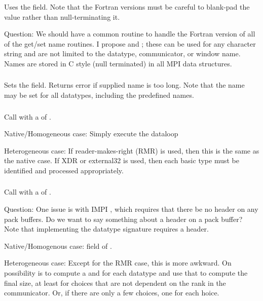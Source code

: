 \documentclass{article}
\begin{document}
\subsubsection{}
Uses the  field.  Note that the Fortran
versions must be careful to 
blank-pad the value rather than null-terminating it.

Question: We should have a common routine to handle the Fortran version of all
of the get/set name routines.  I propose  and
; these can be used for any character string and
are not limited to the datatype, communicator, or window name.  Names are
stored in C style (null terminated) in all MPI data structures.

\subsubsection{}
Sets the  field.  Returns error if supplied
name is too long. 
Note that the name may be set for all datatypes, including the predefined
names.

\subsubsection{}
Call  with a  of .
\begin{adi3}
Native/Homogeneous case: Simply execute the dataloop

Heterogeneous case: If reader-makes-right (RMR) is used, then this is the same
as the native case.  If XDR or external32 is used, then each basic type must
be identified and processed appropriately.
\end{adi3}

\subsubsection{}
Call  with a  of .

Question: One issue is with IMPI \cite{impi}, which requires that there be no
header on any pack buffers.  Do we want to say something about a header on a
pack buffer?  Note that implementing the datatype signature
\cite{gro:mpi-datatypes:pvmmpi00} requires a header. 

\begin{adi3}
Native/Homogenous case:  field of
. 

Heterogeneous case: Except for the RMR case, this is more awkward.  On
possibility is to compute a 
 and  for
each datatype and use that to compute the final size, at least for choices
that are not dependent on the rank in the communicator.  Or, if there
are only a few choices, one for each hoice.
\end{adi3}
\end{document}

